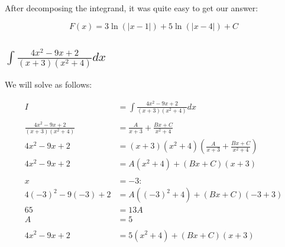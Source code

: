 \documentclass[12pt]{article}
\begin{document}
After decomposing the integrand, it was quite easy to get our answer:

$$
    F(x) = 3\ln(|x-1|) + 5\ln(|x-4|) + C
$$

\subsection{$\int \frac{4x^2-9x+2}{(x+3)(x^2+4)} dx$}

We will solve as follows:


\begin{align}
    I                              & = \int \frac{4x^2-9x+2}{(x+3)(x^2+4)} dx                                                  \\
    \nonumber                                                                                                                  \\
    \frac{4x^2-9x+2}{(x+3)(x^2+4)} & = \frac{A}{x+3} + \frac{Bx + C}{x^2+4}                                                    \\
    4x^2-9x+2                      & = (x+3)(x^2+4)\left(\frac{A}{x+3} + \frac{Bx + C}{x^2+4}\right)                           \\
    4x^2-9x+2                      & = A(x^2+4) + (Bx + C)(x+3)                                                                \\
    \nonumber                                                                                                                  \\
    x                              & =-3:                                                                                      \\
    4(-3)^2-9(-3)+2                & = A((-3)^2+4) + (Bx + C)(-3+3)                                                            \\
    65                             & = 13A                                                                                     \\
    A                              & = 5                                                                                       \\
    \nonumber                                                                                                                  \\
    4x^2-9x+2                      & = 5(x^2+4) + (Bx + C)(x+3)                                                                \\

\end{align}
\end{document}
